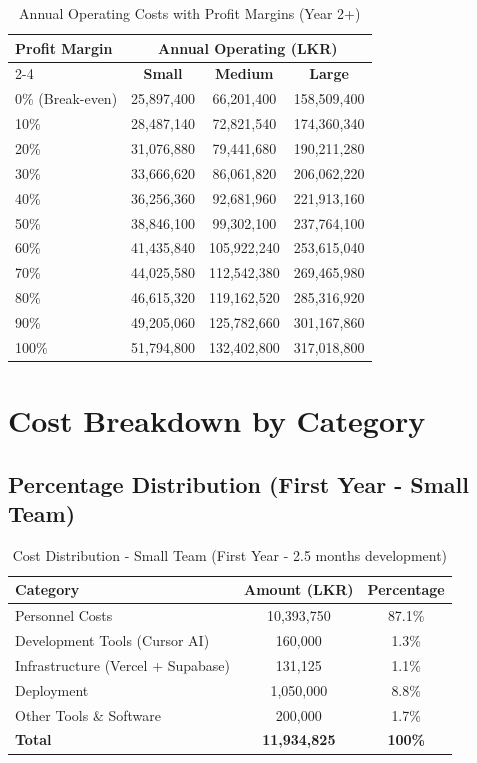 \documentclass[12pt,a4paper]{article}
\begin{document}
\begin{table}[H]
\centering
\small
\begin{tabular}{|l|c|c|c|}
\hline
\multirow{2}{*}{\textbf{Profit Margin}} & \multicolumn{3}{c|}{\textbf{Annual Operating (LKR)}} \\
\cline{2-4}
 & \textbf{Small} & \textbf{Medium} & \textbf{Large} \\
\hline
0\% (Break-even) & 25,897,400 & 66,201,400 & 158,509,400 \\
10\% & 28,487,140 & 72,821,540 & 174,360,340 \\
20\% & 31,076,880 & 79,441,680 & 190,211,280 \\
30\% & 33,666,620 & 86,061,820 & 206,062,220 \\
40\% & 36,256,360 & 92,681,960 & 221,913,160 \\
50\% & 38,846,100 & 99,302,100 & 237,764,100 \\
60\% & 41,435,840 & 105,922,240 & 253,615,040 \\
70\% & 44,025,580 & 112,542,380 & 269,465,980 \\
80\% & 46,615,320 & 119,162,520 & 285,316,920 \\
90\% & 49,205,060 & 125,782,660 & 301,167,860 \\
100\% & 51,794,800 & 132,402,800 & 317,018,800 \\
\hline
\end{tabular}
\caption{Annual Operating Costs with Profit Margins (Year 2+)}
\end{table}

\section{Cost Breakdown by Category}

\subsection{Percentage Distribution (First Year - Small Team)}

\begin{table}[H]
\centering
\begin{tabular}{|l|c|c|}
\hline
\textbf{Category} & \textbf{Amount (LKR)} & \textbf{Percentage} \\
\hline
Personnel Costs & 10,393,750 & 87.1\% \\
Development Tools (Cursor AI) & 160,000 & 1.3\% \\
Infrastructure (Vercel + Supabase) & 131,125 & 1.1\% \\
Deployment & 1,050,000 & 8.8\% \\
Other Tools \& Software & 200,000 & 1.7\% \\
\hline
\textbf{Total} & \textbf{11,934,825} & \textbf{100\%} \\
\hline
\end{tabular}
\caption{Cost Distribution - Small Team (First Year - 2.5 months development)}
\end{table}
\end{document}
